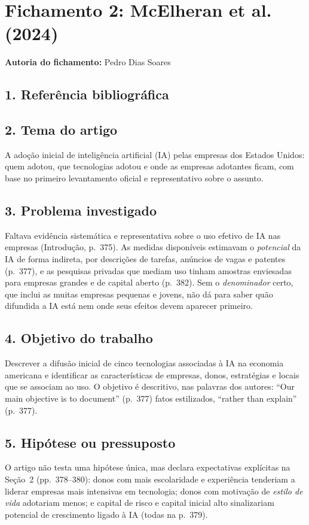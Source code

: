 \section{Fichamento 2: McElheran et al. (2024)}

\noindent\textbf{Autoria do fichamento:} Pedro Dias Soares

\subsection*{1. Referência bibliográfica}
\noindent{}

\subsection*{2. Tema do artigo}
A adoção inicial de inteligência artificial (IA) pelas empresas dos Estados Unidos: quem adotou,
que tecnologias adotou e onde as empresas adotantes ficam, com base no primeiro levantamento
oficial e representativo sobre o assunto.

\subsection*{3. Problema investigado}
Faltava evidência sistemática e representativa sobre o uso efetivo de IA nas empresas (Introdução,
p.~375). As medidas disponíveis estimavam o \emph{potencial} da IA de forma indireta, por descrições
de tarefas, anúncios de vagas e patentes (p.~377), e as pesquisas privadas que mediam uso tinham
amostras enviesadas para empresas grandes e de capital aberto (p.~382). Sem o \emph{denominador}
certo, que inclui as muitas empresas pequenas e jovens, não dá para saber quão difundida a IA está
nem onde seus efeitos devem aparecer primeiro.

\subsection*{4. Objetivo do trabalho}
Descrever a difusão inicial de cinco tecnologias associadas à IA na economia americana e
identificar as características de empresas, donos, estratégias e locais que se associam ao uso.
O objetivo é descritivo, nas palavras dos autores: ``Our main objective is to document'' (p.~377)
fatos estilizados, ``rather than explain'' (p.~377).

\subsection*{5. Hipótese ou pressuposto}
O artigo não testa uma hipótese única, mas declara expectativas explícitas na Seção~2
(pp.~378--380): donos com mais escolaridade e experiência tenderiam a liderar empresas mais
intensivas em tecnologia; donos com motivação de \emph{estilo de vida} adotariam menos; e capital
de risco e capital inicial alto sinalizariam potencial de crescimento ligado à IA (todas na
p.~379).

